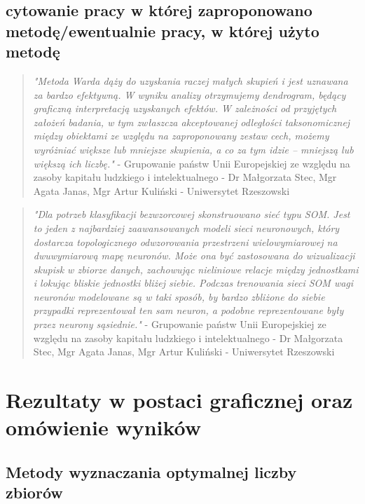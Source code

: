 \documentclass{article}
\begin{document}
    \subsection{cytowanie pracy w której zaproponowano metodę/ewentualnie pracy, w której użyto metodę} 
        \begin{quotation}
            \textit{"Metoda Warda dąży do uzyskania raczej małych skupień i jest uznawana za bardzo efektywną. W wyniku analizy otrzymujemy dendrogram,
            będący graficzną interpretacją uzyskanych efektów. W zależności od przyjętych założeń badania, w tym zwłaszcza akceptowanej odległości
            taksonomicznej między obiektami ze względu na zaproponowany zestaw cech, możemy wyróżniać większe lub mniejsze skupienia, a co za tym
            idzie – mniejszą lub większą ich liczbę."}
            - Grupowanie państw Unii Europejskiej ze względu na zasoby kapitału ludzkiego i intelektualnego - Dr Małgorzata Stec, 
            Mgr Agata Janas, Mgr Artur Kuliński - Uniwersytet Rzeszowski
        \end{quotation}
        \begin{quotation}
            \textit{"Dla potrzeb klasyfikacji bezwzorcowej skonstruowano sieć typu SOM. Jest to jeden z najbardziej zaawansowanych 
            modeli sieci neuronowych, który dostarcza topologicznego odwzorowania przestrzeni wielowymiarowej na dwuwymiarową mapę neuronów. 
            Może ona być zastosowana do wizualizacji skupisk w zbiorze danych, zachowując nieliniowe relacje między jednostkami i lokując 
            bliskie jednostki bliżej siebie. Podczas trenowania sieci SOM wagi neuronów modelowane są w taki sposób, by bardzo zbliżone do 
            siebie przypadki reprezentował ten sam neuron, a podobne reprezentowane były przez neurony sąsiednie."}
            - Grupowanie państw Unii Europejskiej ze względu na zasoby kapitału ludzkiego i intelektualnego - Dr Małgorzata Stec, 
            Mgr Agata Janas, Mgr Artur Kuliński - Uniwersytet Rzeszowski
        \end{quotation}
    

\section{Rezultaty w postaci graficznej oraz omówienie wyników}
    \subsection{Metody wyznaczania optymalnej liczby zbiorów}
\end{document}

